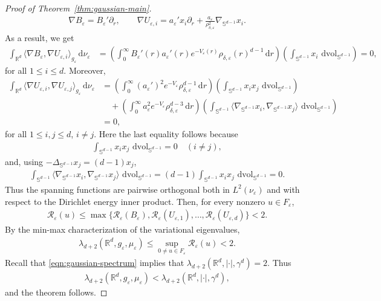 \documentclass[11pt,reqno]{amsart}
\numberwithin{equation}{section}
\theoremstyle{definition}
\theoremstyle{remark}
\def\cR {\mathcal{R}}
\newcommand{\la}{\langle}
\newcommand{\ra}{\rangle}
\newcommand{\ud}{\mathrm{d}}
\newcommand{\0}{\emptyset}
\newcommand{\veps}{\varepsilon}
\newcommand{\bbR}{\mathbb R}
\newcommand{\bbS}{\mathbb S}
\newcommand{\dvol}{\,\mathrm{dvol}}
\begin{document}
\begin{proof}[Proof of Theorem~\ref{thm:gaussian-main}]
\begin{align}
        \nabla B_\veps=B_\veps'\partial_r,
        \qquad
        \nabla U_{\veps,i}
        =
        a_\veps'x_i\partial_r
        +
        \frac{a_\veps}{\rho_{\delta,\veps}^2}
        \nabla_{\bbS^{d-1}}x_i.
\end{align}
As a result, we get
\begin{align}
        \int_{\bbR^d}\la\nabla B_\veps,\nabla U_{\veps,i}\ra_{g_\veps}\,\ud\nu_\veps
        &=
        \left(\int_0^\infty
        B_\veps'(r)a_\veps'(r)e^{-V_\veps(r)}
        \rho_{\delta,\veps}(r)^{d-1}\,\ud r
        \right)
        \left(\int_{\bbS^{d-1}}x_i\,\dvol_{\bbS^{d-1}}\right)
        =
        0,
\end{align}
for all \(1\leq i\leq d\). Moreover,
\begin{align}
        \int_{\bbR^d}\la\nabla U_{\veps,i},\nabla U_{\veps,j}\ra_{g_\veps}\,\ud\nu_\veps
        &=
        \left(\int_0^\infty
        (a_\veps')^2e^{-V_\veps}
        \rho_{\delta,\veps}^{d-1}\,\ud r
        \right)
        \left(\int_{\bbS^{d-1}}x_ix_j\,\dvol_{\bbS^{d-1}}\right)\\
        &\quad+
        \left(\int_0^\infty
        a_\veps^2e^{-V_\veps}
        \rho_{\delta,\veps}^{d-3}\,\ud r
        \right)
        \left(\int_{\bbS^{d-1}}
        \la\nabla_{\bbS^{d-1}}x_i,\nabla_{\bbS^{d-1}}x_j\ra
        \,\dvol_{\bbS^{d-1}}\right)\\
        &=
        0,
\end{align}
for all \(1\leq i,j\leq d\), \(i\neq j\). Here the last equality follows because
\begin{align}
        \int_{\bbS^{d-1}}x_ix_j\,\dvol_{\bbS^{d-1}}=0
        \quad(i\neq j),
\end{align}
and, using \(-\Delta_{\bbS^{d-1}}x_j=(d-1)x_j\),
\begin{align}
        \int_{\bbS^{d-1}}
        \la\nabla_{\bbS^{d-1}}x_i,\nabla_{\bbS^{d-1}}x_j\ra
        \,\dvol_{\bbS^{d-1}}
        =
        (d-1)\int_{\bbS^{d-1}}x_ix_j\,\dvol_{\bbS^{d-1}}
        =
        0.
\end{align}
Thus the spanning functions are pairwise orthogonal both in \(L^2(\nu_\veps)\)
and with respect to the Dirichlet energy inner product. Then, for every nonzero \(u\in F_\veps\),
\begin{align}
        \cR_\veps(u)
        \leq
        \max\{\cR_\veps(B_\veps),
              \cR_\veps(U_{\veps,1}),\dots,\cR_\veps(U_{\veps,d})\}
        <2.
\end{align}
By the min-max characterization of the variational eigenvalues,
\begin{align}
        \lambda_{d+2}(\bbR^d,g_\veps,\mu_\veps)
        \leq
        \sup_{0\neq u\in F_\veps}\cR_\veps(u)
        <2.
\end{align}
Recall that \eqref{eqn:gaussian-spectrum} implies that
\(\lambda_{d+2}(\bbR^d,|\cdot|,\gamma^d)=2\). Thus
\begin{align}
        \lambda_{d+2}(\bbR^d,g_\veps,\mu_\veps)
        <
        \lambda_{d+2}(\bbR^d,|\cdot|,\gamma^d),
\end{align}
and the theorem follows.
\end{proof}
\end{document}
